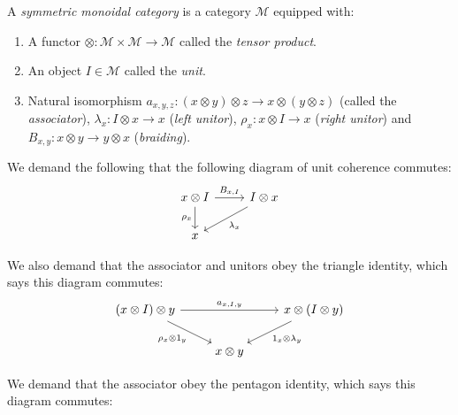 \documentclass[TFM.tex]{subfiles}
\begin{document}
\begin{defi}\label{monoidal}
A \emph{symmetric monoidal category} is a category $\mathscr{M}$ equipped with:
\begin{enumerate}[(1)]
\item A functor $\otimes: \mathscr{M}\times \mathscr{M}\to \mathscr{M}$ called the \emph{tensor product}.
\item An object $I\in \mathscr{M}$ called the \emph{unit}.
\item Natural isomorphism $a_{x,y,z} : (x \otimes y) \otimes z \to x \otimes (y \otimes z)$ (called the \emph{associator}), $\lambda_x : I \otimes x \to x$ (\emph{left unitor}), $\rho_x : x \otimes I \to x$ (\emph{right unitor}) and $B_{x,y}: x\otimes y\to y\otimes x$ (\emph{braiding}).
\end{enumerate}

We demand the following that the following diagram of unit coherence commutes:
\[
\begin{tikzcd}
x\otimes I\arrow[r, "B_{x,I}"]\arrow[d, "\rho_x"']& I\otimes x\arrow[dl, "\lambda_x"]\\
x & 
\end{tikzcd}
\]

We also demand that the associator and unitors obey the triangle identity, which says this diagram commutes:
\[
\begin{tikzcd}
(x\otimes I)\otimes y \arrow[rr, "{a_{x,I,y}}"] \arrow[rd, "\rho_x\otimes 1_y"'] &            & x\otimes (I\otimes y) \arrow[ld, "1_x\otimes\lambda_y"] \\
& x\otimes y &                                                        
\end{tikzcd}
\]

We demand that the associator obey the pentagon identity, which says this diagram commutes:


\end{defi}
\end{document}
